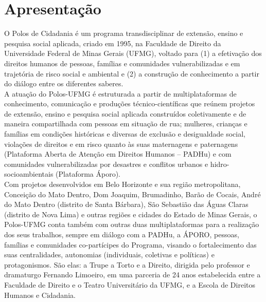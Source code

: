 \documentclass[12pt]{article}
\begin{document}

\newpage
\thispagestyle{empty}
\doublespacing
\tableofcontents
\newpage
\listoffigures
\newpage
\listoftables
\singlespacing

\newpage

\setcounter{section}{0}
\setcounter{page}{1}
\doublespacing

\section*{Apresentação}
\vspace{1cm}

O Polos de Cidadania é um programa transdisciplinar de extensão, ensino e pesquisa social aplicada, criado em 1995, na Faculdade de Direito da Universidade Federal de Minas Gerais (UFMG), voltado para (1) a efetivação dos direitos humanos de pessoas, famílias e comunidades vulnerabilizadas e em trajetória de risco social e ambiental e (2) a construção de conhecimento a partir do diálogo entre os diferentes saberes.\\

A atuação do Polos-UFMG é estruturada a partir de multiplataformas de conhecimento, comunicação e produções técnico-científicas que reúnem projetos de extensão, ensino e pesquisa social aplicada construídos coletivamente e de maneira compartilhada com pessoas em situação de rua; mulheres, crianças e famílias em condições históricas e diversas de exclusão e desigualdade social, violações de direitos e em risco quanto às suas maternagens e paternagens (Plataforma Aberta de Atenção em Direitos Humanos – PADHu) e com comunidades vulnerabilizadas por desastres e conflitos urbanos e hidro-socioambientais (Plataforma Áporo).\\

Com projetos desenvolvidos em Belo Horizonte e sua região metropolitana, Conceição do Mato  Dentro, Dom Joaquim, Brumadinho, Barão de Cocais, André do Mato Dentro (distrito de Santa Bárbara), São Sebastião das Águas Claras (distrito de Nova Lima) e outras regiões e cidades do Estado de Minas Gerais, o Polos-UFMG conta também com outras duas multiplataformas para a realização dos seus trabalhos, sempre em diálogo com a PADHu, a ÁPORO, pessoas, famílias e comunidades co-partícipes do Programa, visando o fortalecimento das suas centralidades, autonomias (individuais, coletivas e políticas) e protagonismos. São elas: a Trupe a Torto e a Direito, dirigida pelo professor e dramaturgo Fernando Limoeiro, em uma parceria de 24 anos estabelecida entre a Faculdade de Direito e o Teatro Universitário da UFMG, e a Escola de Direitos Humanos e Cidadania.\\
\end{document}
